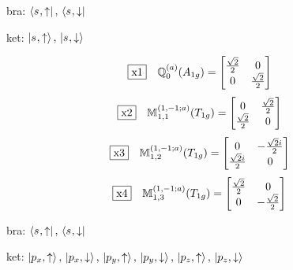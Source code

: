 \documentclass[fleqn,10pt,landscape]{jsarticle}
\begin{document}
\vspace{5mm}

\noindent\textbullet\, bra: $\bra{s_{},\uparrow},\, \bra{s_{},\downarrow}$

\noindent\textbullet\, ket: $\ket{s_{},\uparrow},\, \ket{s_{},\downarrow}$

\begin{dmath*}
\fbox{x1}\quad \mathbb{Q}_{0}^{(a)}(A_{1g})=\begin{bmatrix} \frac{\sqrt{2}}{2} & 0 \\ 0 & \frac{\sqrt{2}}{2} \end{bmatrix}
\end{dmath*}
\begin{dmath*}
\fbox{x2}\quad \mathbb{M}_{1,1}^{(1,-1;a)}(T_{1g})=\begin{bmatrix} 0 & \frac{\sqrt{2}}{2} \\ \frac{\sqrt{2}}{2} & 0 \end{bmatrix}
\end{dmath*}
\begin{dmath*}
\fbox{x3}\quad \mathbb{M}_{1,2}^{(1,-1;a)}(T_{1g})=\begin{bmatrix} 0 & - \frac{\sqrt{2} i}{2} \\ \frac{\sqrt{2} i}{2} & 0 \end{bmatrix}
\end{dmath*}
\begin{dmath*}
\fbox{x4}\quad \mathbb{M}_{1,3}^{(1,-1;a)}(T_{1g})=\begin{bmatrix} \frac{\sqrt{2}}{2} & 0 \\ 0 & - \frac{\sqrt{2}}{2} \end{bmatrix}
\end{dmath*}
\vspace{5mm}

\noindent\textbullet\, bra: $\bra{s_{},\uparrow},\, \bra{s_{},\downarrow}$

\noindent\textbullet\, ket: $\ket{p_{x},\uparrow},\, \ket{p_{x},\downarrow},\, \ket{p_{y},\uparrow},\, \ket{p_{y},\downarrow},\, \ket{p_{z},\uparrow},\, \ket{p_{z},\downarrow}$
\end{document}
